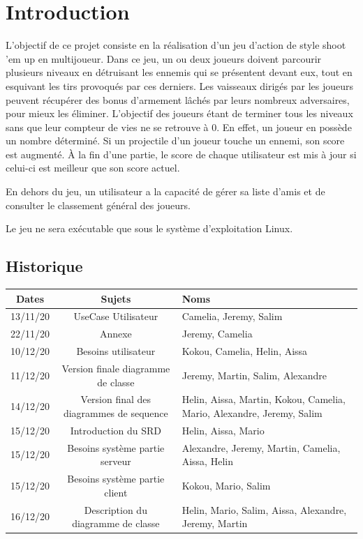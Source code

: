 \documentclass[a4paper,12pt]{article}
\begin{document}
\newpage

\tableofcontents

\newpage


\section{Introduction}

L’objectif de ce projet consiste en la réalisation d'un jeu d'action de style shoot 'em up en multijoueur. Dans ce jeu, un ou deux joueurs doivent parcourir plusieurs niveaux en détruisant les ennemis qui se présentent devant eux, tout en esquivant les tirs provoqués par ces derniers. Les vaisseaux dirigés par les joueurs peuvent récupérer des bonus d’armement lâchés par leurs nombreux adversaires, pour mieux les éliminer. L'objectif des joueurs étant de terminer tous les niveaux sans que leur compteur de vies ne se retrouve à 0. En effet, un joueur en possède un nombre déterminé. Si un projectile d'un joueur touche un ennemi, son score est augmenté. À la fin d'une partie, le score de chaque utilisateur est mis à jour si celui-ci est meilleur que son score actuel.

En dehors du jeu, un utilisateur a la capacité de gérer sa liste d'amis et de consulter le classement général des joueurs.

Le jeu ne sera exécutable que sous le système d'exploitation Linux.

\subsection{Historique}
\begin{tabularx}{15cm}{|c|c|X|}
	\hline
		Dates & Sujets & Noms \\
	\hline
		13/11/20 & UseCase Utilisateur & Camelia, Jeremy, Salim \\
	\hline
		22/11/20 & Annexe & Jeremy, Camelia \\
	\hline
		10/12/20 & Besoins utilisateur & Kokou, Camelia, Helin, Aissa\\
	\hline
		11/12/20 & Version finale diagramme de classe  & Jeremy, Martin, Salim, Alexandre\\
	\hline
		14/12/20 & Version final des diagrammes de sequence & Helin, Aissa, Martin, Kokou, Camelia, 
		Mario, Alexandre, Jeremy, Salim\\
	\hline
		15/12/20 & Introduction du SRD & Helin, Aissa, Mario\\
	\hline
		15/12/20 & Besoins système partie serveur & Alexandre, Jeremy, Martin, Camelia, Aissa, Helin\\
	\hline
		15/12/20 & Besoins système partie client & Kokou, Mario, Salim\\
	\hline
		16/12/20 & Description du diagramme de classe & Helin, Mario, Salim, Aissa,
		Alexandre, Jeremy, Martin\\
	\hline
\end{tabularx}
\end{document}
